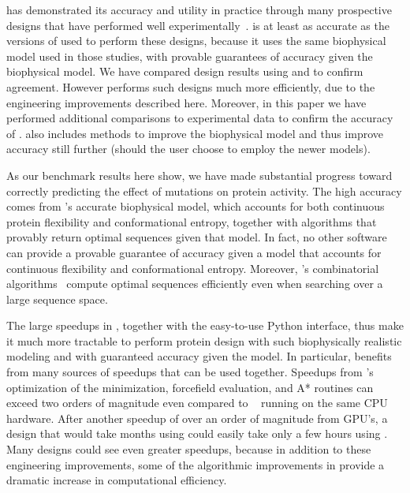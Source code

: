 \osprey has demonstrated its accuracy and utility in practice through many prospective designs that have performed well experimentally~\cite{VRC07_enhance,CFTR,runx1_cbfb,GrsA-LeuA,DHFR-PNAS,GrsA-TyrA,specific_probes}.   is at least as accurate as the versions of \osprey used to perform these designs, because it uses the same biophysical model used in those studies, with provable guarantees of accuracy given the biophysical model.  We have compared design results using  and  to confirm agreement.  However  performs such designs much more efficiently, due to the engineering improvements described here.  Moreover, in this paper we have performed additional comparisons to experimental data to confirm the accuracy of .   also includes methods to improve the biophysical model and thus improve accuracy still further (should the user choose to employ the newer models). 

As our benchmark results here show, we have made substantial progress toward correctly predicting the effect of mutations on protein activity.  The high accuracy comes from \osprey's accurate biophysical model, which accounts for both continuous protein flexibility and conformational entropy, together with algorithms that provably return optimal sequences given that model.  In fact, no other software can provide a provable guarantee of accuracy given a model that accounts for continuous flexibility and conformational entropy.  Moreover, \osprey's combinatorial algorithms~\cite{alg_SMB_textbook,cosb_design} compute optimal sequences efficiently even when searching over a large sequence space.  

The large speedups in , together with the easy-to-use Python interface, thus make it much more tractable to perform protein design with such biophysically realistic modeling and with guaranteed accuracy given the model.  In particular,  benefits from many sources of speedups that can be used together.  Speedups from 's optimization of the minimization, forcefield evaluation, and A* routines can exceed two orders of magnitude even compared to ~\cite{COMETS} running on the same CPU hardware.  After another speedup of over an order of magnitude from GPU's, a design that would take months using  could easily take only a few hours using .  Many designs could see even greater speedups, because in addition to these engineering improvements, some of the algorithmic improvements in  provide a dramatic increase in computational efficiency.  

